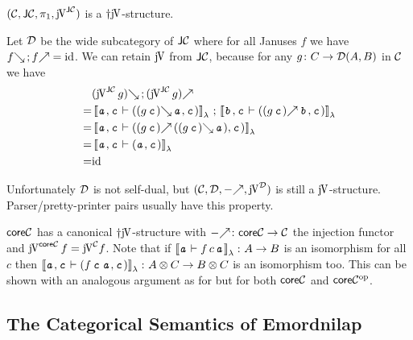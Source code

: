 \documentclass[runningheads,envcountsame]{llncs}
\begin{document}
    \begin{example}
        $(\C, \JC, \pi_1, \juncurry[\JC])$ is a $\dagger\juncurry$-structure.
    \end{example}
    \begin{example}\label{ex:semi-inverse}
        Let $\mathcal{D}$ be the wide subcategory of $\mathsf{J}\mathcal{C}$ where for all Januses $f$ we have $\comp{\b{f}}{\f{f}} = \id$. We can retain $\juncurry$ from $\mathsf{J}\mathcal{C}$, because for any $g\colon C \to \mathcal{D}(A, B)$ in $\mathcal{C}$ we have
        \begin{align*}
          & \comp{\b{(\juncurry[\JC]\,g)}}{\f{(\juncurry[\JC]\,g)}} \\
        = & \comp{\semL{\evar{a}, \evar{c} \vdash \epair{\eapp{\b{(\eapp{g}{\evar{c}})}}{\evar{a}}}{\evar{c}}}}{\semL{\evar{b}, \evar{c} \vdash \epair{\eapp{\f{(\eapp{g}{\evar{c}})}}{\evar{b}}}{\evar{c}}}} \\
        = & \semL{\evar{a}, \evar{c} \vdash \epair{\eapp{\f{(\eapp{g}{\evar{c}})}}{(\eapp{\b{(\eapp{g}{\evar{c}})}}{\evar{a}})}}{\evar{c}}} \\
        = & \semL{\evar{a}, \evar{c} \vdash \epair{\evar{a}}{\evar{c}}} \\
        = & \id
        \end{align*}
        
        Unfortunately $\mathcal{D}$ is not self-dual, but $(\C, \D, \f{-}, \juncurry[\D])$ is still a $\juncurry$-structure. Parser/pretty-printer pairs usually have this property.
    \end{example}
    \begin{example} \label{ex:coreC}
        $\mathsf{core}\mathcal{C}$ has a canonical $\dagger\juncurry$-structure with $\f{-}\colon \coreC \to \C$ the injection functor and $\juncurry[\coreC]\,f = \juncurry[\C] f$. Note that if $\semL{\evar{a} \vdash \eapp{\eapp{f}{c}}{\evar{a}}} \colon A \to B$ is an isomorphism for all $c$ then $\semL{\evar{a}, \evar{c} \vdash \epair{\eapp{\eapp{f}{\evar{c}}}{\evar{a}}}{\evar{c}}} \colon \tensor{A}{C} \to \tensor{B}{C}$ is an isomorphism too. This can be shown with an analogous argument as for  but for both $\mathsf{core}\mathcal{C}$ and ${\mathsf{core}\mathcal{C}^\mathrm{op}}$.
    \end{example}
    
\subsection{The Categorical Semantics of Emordnilap}
\end{document}
